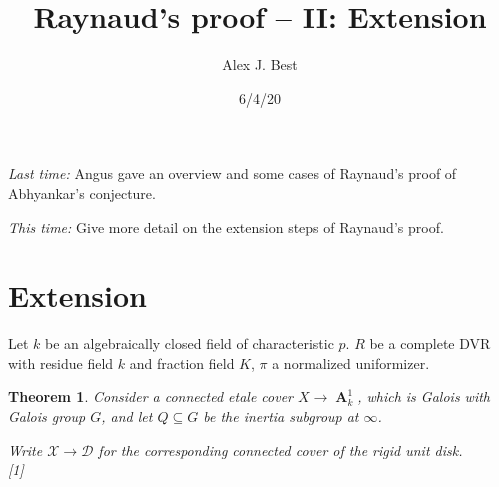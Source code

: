 \documentclass[oneside,12pt,]{article}
\title{Raynaud's proof -- II: Extension}
\author{Alex J. Best}
\date{6/4/20}
\newtheorem{theorem}{Theorem}
\DeclareMathOperator{\aff}{\mathbf{A}}
\begin{document}
\maketitle
\emph{Last time:} Angus gave an overview and some cases of Raynaud's proof of Abhyankar's conjecture.

\emph{This time:} Give more detail on the extension steps of Raynaud's proof.


\section{Extension}

Let $k$ be an algebraically closed field of characteristic $p$. $R$ be a complete DVR with residue field $k$ and fraction field $K$, $\pi $ a normalized uniformizer.

\begin{theorem}
    Consider a connected etale cover $X\to \aff^1_k$, which is Galois with Galois group $G$, and let $Q \subseteq G $ be the inertia subgroup at $\infty$.

    Write $\mathscr X \to \mathscr D$ for the corresponding connected cover of the rigid unit disk.\\


    [1]


\end{theorem}
\end{document}
